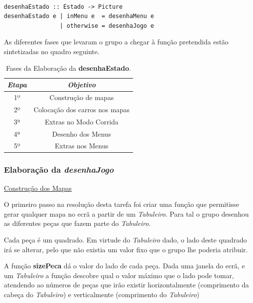 \documentclass[a4paper]{report} %
\begin{document}
\begin{verbatim}

desenhaEstado :: Estado -> Picture
desenhaEstado e | inMenu e  = desenhaMenu e
                | otherwise = desenhaJogo e

\end{verbatim}

As diferentes fases que levaram o grupo a chegar à função pretendida estão sintetizadas no quadro seguinte.


\begin{table}[!h]
\begin{center}
\begin{tabular}{|c|c|}
    \hline
  \emph{Etapa} & \emph{Objetivo} \\
    \hline
  1º & Construção de mapas \\
    \hline
  2º & Colocação dos carros nos mapas \\
    \hline  
  3ª & Extras no Modo Corrida \\
    \hline
  4ª & Desenho dos Menus \\
    \hline
  5º & Extras nos Menus \\
    \hline

\end{tabular}
\end{center}
\caption{Fases da Elaboração da \textbf{desenhaEstado}.}
\end{table}


\subsubsection{Elaboração da \emph{desenhaJogo}}

\maketitle\underline{Construção dos Mapas}

O primeiro passo na resolução desta tarefa foi criar uma função que permitisse gerar qualquer mapa no ecrã a partir de um \emph{Tabuleiro}.
Para tal o grupo desenhou as diferentes peças que fazem parte do \emph{Tabuleiro}.

Cada peça é um quadrado. Em virtude do \emph{Tabuleiro} dado, o lado deste quadrado irá se alterar, pelo que não existia um valor fixo que o grupo lhe poderia atribuir. 

A função \textbf{sizePeca} dá o valor do lado de cada peça. Dada uma janela do ecrã, e um \emph{Tabuleiro} a função descobre qual o valor máximo que o lado pode tomar, atendendo ao números de peças que irão existir horizontalmente (comprimento da cabeça do \emph{Tabuleiro}) e verticalmente (comprimento do \emph{Tabuleiro}) 
\end{document}
